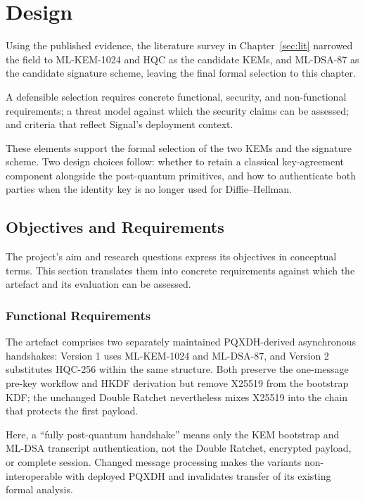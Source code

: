 \section{Design}
\label{sec:design}
Using the published evidence, the literature survey in Chapter~\ref{sec:lit} narrowed the field to ML-KEM-1024 and HQC as the candidate KEMs, and ML-DSA-87 as the candidate signature scheme, leaving the final formal selection to this chapter.

A defensible selection requires concrete functional, security, and non-functional requirements; a threat model against which the security claims can be assessed; and criteria that reflect Signal's deployment context.

These elements support the formal selection of the two KEMs and the signature scheme. Two design choices follow: whether to retain a classical key-agreement component alongside the post-quantum primitives, and how to authenticate both parties when the identity key is no longer used for Diffie--Hellman.

\subsection{Objectives and Requirements}
\label{subsec:objectives}

The project's aim and research questions express its objectives in conceptual terms. This section translates them into concrete requirements against which the artefact and its evaluation can be assessed.

\subsubsection{Functional Requirements}
\label{subsubsec:req-functional}

The artefact comprises two separately maintained PQXDH-derived asynchronous handshakes: Version 1 uses ML-KEM-1024 and ML-DSA-87, and Version 2 substitutes HQC-256 within the same structure. Both preserve the one-message pre-key workflow and HKDF derivation but remove X25519 from the bootstrap KDF; the unchanged Double Ratchet nevertheless mixes X25519 into the chain that protects the first payload.

Here, a ``fully post-quantum handshake'' means only the KEM bootstrap and ML-DSA transcript authentication, not the Double Ratchet, encrypted payload, or complete session. Changed message processing makes the variants non-interoperable with deployed PQXDH and invalidates transfer of its existing formal analysis.

